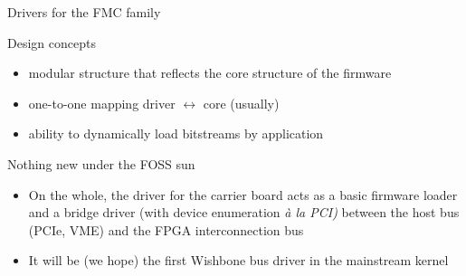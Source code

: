 \documentclass[compress,red]{beamer}
\begin{document}
\begin{frame}{Drivers for the FMC family}

\begin{block}{Design concepts}
\begin{itemize}
\pause
\item modular structure that reflects the core structure of the firmware
\pause
\item one-to-one mapping driver $\leftrightarrow$ core (usually)
\pause
\item ability to dynamically load bitstreams by application
\end{itemize}
\end{block}

\pause
\begin{block}{Nothing new under the FOSS sun}
\begin{itemize}
\pause\item
On the whole, the driver for the carrier board acts as a basic firmware
loader and a bridge driver (with device enumeration
\emph{\`a la PCI)} between the host bus (PCIe, VME) and the FPGA
interconnection bus
\pause\item
It will be (we hope) the first Wishbone bus driver in the mainstream
kernel
\end{itemize}
\end{block}

\end{frame}
\end{document}
